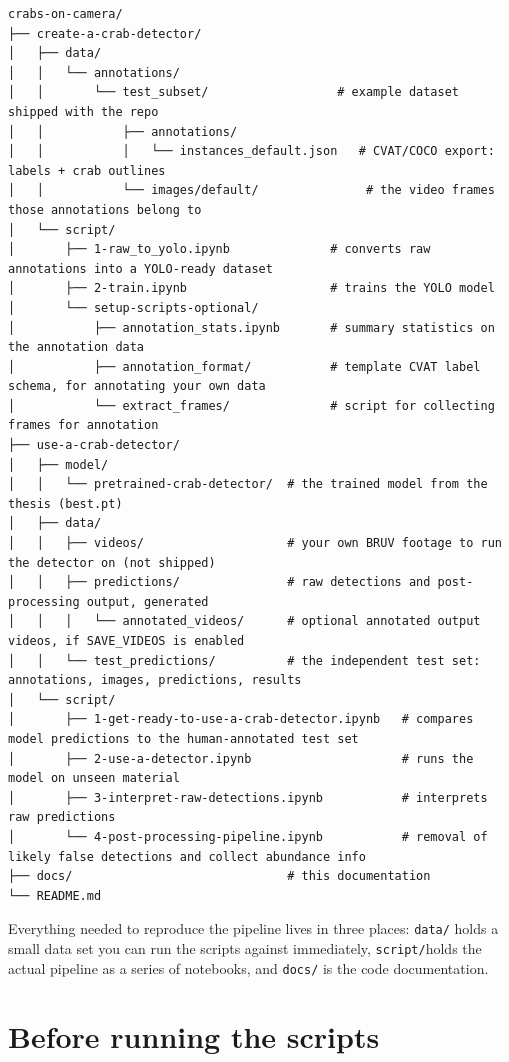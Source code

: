 \documentclass[
]{book}
\begin{document}
\begin{verbatim}
crabs-on-camera/
├── create-a-crab-detector/
│   ├── data/
│   │   └── annotations/
│   │       └── test_subset/                  # example dataset shipped with the repo
│   │           ├── annotations/
│   │           │   └── instances_default.json   # CVAT/COCO export: labels + crab outlines
│   │           └── images/default/               # the video frames those annotations belong to
│   └── script/
│       ├── 1-raw_to_yolo.ipynb              # converts raw annotations into a YOLO-ready dataset
│       ├── 2-train.ipynb                    # trains the YOLO model
│       └── setup-scripts-optional/
│           ├── annotation_stats.ipynb       # summary statistics on the annotation data
│           ├── annotation_format/           # template CVAT label schema, for annotating your own data
│           └── extract_frames/              # script for collecting frames for annotation
├── use-a-crab-detector/
│   ├── model/
│   │   └── pretrained-crab-detector/  # the trained model from the thesis (best.pt)
│   ├── data/
│   │   ├── videos/                    # your own BRUV footage to run the detector on (not shipped)
│   │   ├── predictions/               # raw detections and post-processing output, generated
│   │   │   └── annotated_videos/      # optional annotated output videos, if SAVE_VIDEOS is enabled
│   │   └── test_predictions/          # the independent test set: annotations, images, predictions, results
│   └── script/
│       ├── 1-get-ready-to-use-a-crab-detector.ipynb   # compares model predictions to the human-annotated test set
│       ├── 2-use-a-detector.ipynb                     # runs the model on unseen material
│       ├── 3-interpret-raw-detections.ipynb           # interprets raw predictions
│       └── 4-post-processing-pipeline.ipynb           # removal of likely false detections and collect abundance info
├── docs/                              # this documentation
└── README.md
\end{verbatim}

Everything needed to reproduce the pipeline lives in three places: \texttt{data/} holds a small data set you can run the scripts against immediately, \texttt{script/}holds the actual pipeline as a series of notebooks, and \texttt{docs/} is the code documentation.

\section{Before running the scripts}\label{before-running-the-scripts}
\end{document}
